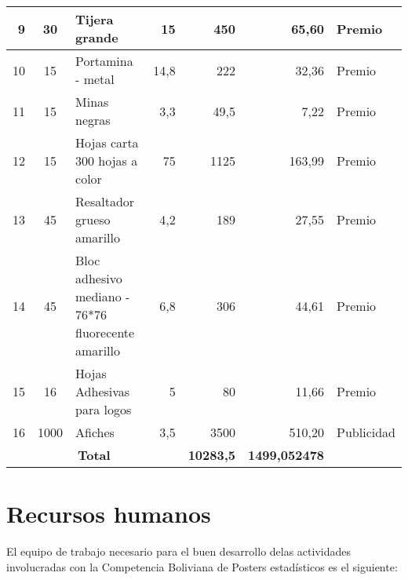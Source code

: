 \documentclass{article}
\begin{document}
\begin{table}[htbp]
{\begin{tabular}{|cccc|r|r|r}
    \midrule
    \multicolumn{1}{|r|}{9} & \multicolumn{1}{c|}{30} & \multicolumn{1}{l|}{Tijera grande} & \multicolumn{1}{r|}{15} & 450   & 65,60 & \multicolumn{1}{l|}{Premio} \\
    \midrule
    \multicolumn{1}{|r|}{10} & \multicolumn{1}{c|}{15} & \multicolumn{1}{l|}{Portamina - metal} & \multicolumn{1}{r|}{14,8} & 222   & 32,36 & \multicolumn{1}{l|}{Premio} \\
    \midrule
    \multicolumn{1}{|r|}{11} & \multicolumn{1}{c|}{15} & \multicolumn{1}{l|}{Minas negras} & \multicolumn{1}{r|}{3,3} & 49,5  & 7,22  & \multicolumn{1}{l|}{Premio} \\
    \midrule
    \multicolumn{1}{|r|}{12} & \multicolumn{1}{c|}{15} & \multicolumn{1}{l|}{Hojas carta 300 hojas a color} & \multicolumn{1}{r|}{75} & 1125  & 163,99 & \multicolumn{1}{l|}{Premio} \\
    \midrule
    \multicolumn{1}{|r|}{13} & \multicolumn{1}{c|}{45} & \multicolumn{1}{l|}{Resaltador grueso amarillo} & \multicolumn{1}{r|}{4,2} & 189   & 27,55 & \multicolumn{1}{l|}{Premio} \\
    \midrule
    \multicolumn{1}{|r|}{14} & \multicolumn{1}{c|}{45} & \multicolumn{1}{l|}{Bloc adhesivo mediano - 76*76 fluorecente amarillo} & \multicolumn{1}{r|}{6,8} & 306   & 44,61 & \multicolumn{1}{l|}{Premio} \\
    \midrule
    \multicolumn{1}{|r|}{15} & \multicolumn{1}{c|}{16} & \multicolumn{1}{l|}{Hojas Adhesivas para logos} & \multicolumn{1}{r|}{5} & 80    & 11,66 & \multicolumn{1}{l|}{Premio} \\
    \midrule
    \multicolumn{1}{|r|}{16} & \multicolumn{1}{c|}{1000} & \multicolumn{1}{l|}{Afiches} & \multicolumn{1}{r|}{3,5} & 3500  & 510,20 & \multicolumn{1}{l|}{Publicidad} \\
    \midrule
    \multicolumn{4}{|c|}{\textbf{Total}} & \textbf{10283,5} & \textbf{1499,052478} &  \\
\cmidrule{1-6}    \end{tabular}}%
  \label{tab:addlabel}%
\end{table}%



\section{Recursos humanos}

El equipo de trabajo necesario para el buen desarrollo delas actividades involucradas con la Competencia Boliviana de Posters estadísticos es el siguiente: \\
\end{document}
